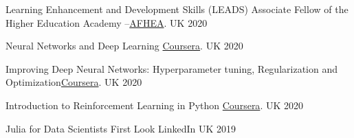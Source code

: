 

\begin{cvhonors}
  \cvhonor
    {Learning Enhancement and Development Skills (LEADS)} %
    {Associate Fellow of the Higher Education Academy --\href{https://github.com/kahramankostas/cv/blob/master/PR185427-HEA0351585.pdf}{AFHEA}.} %
    {UK} %
    {2020} %




  \cvhonor
    {Neural Networks and Deep Learning} %
    {\href{https://www.coursera.org/account/accomplishments/certificate/7KBM35GS4FB7}{Coursera}.} %
    {UK} %
    {2020} %
    
    
      \cvhonor
    {Improving Deep Neural Networks: Hyperparameter tuning, Regularization and Optimization}{\href{https://www.coursera.org/account/accomplishments/certificate/358YXLZNQHT6}{Coursera}.} %
    {UK} %
    {2020} %
    
     \cvhonor
    {Introduction to Reinforcement Learning in Python} %
    {\href{https://www.coursera.org/account/accomplishments/certificate/PAHMAJM7YWWA}{Coursera}.} %
    {UK} %
    {2020} %
    
     \cvhonor
    {Julia for Data Scientists First Look} %
    {LinkedIn} %
    {UK} %
    {2019} %
        
 

\end{cvhonors}